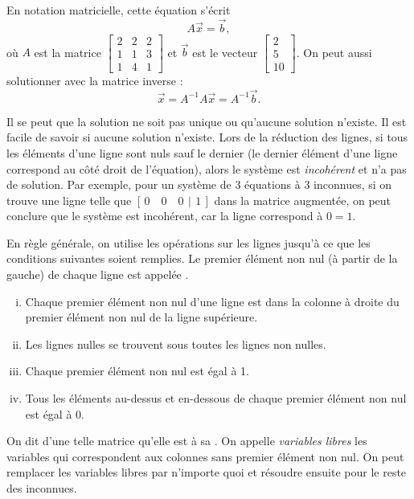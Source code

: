 En notation matricielle, cette équation s’écrit
\begin{equation*}
A \vec{x} = \vec{b} ,
\end{equation*}
où $A$ est la matrice
$\left[ \begin{smallmatrix}
2 & 2 & 2 \\
1 & 1 & 3 \\
1 & 4 & 1 
\end{smallmatrix} \right]$ et $\vec{b}$ est le vecteur
$\left[ \begin{smallmatrix}
2 \\
5 \\
10
\end{smallmatrix} \right]$.  On peut aussi solutionner avec la matrice inverse :
\begin{equation*}
\vec{x} = A^{-1} A \vec{x} = A^{-1} \vec{b} .
\end{equation*}

\medskip

Il se peut que la solution ne soit pas unique ou qu'aucune solution n’existe. Il est facile de savoir si aucune solution n'existe. Lors de la réduction des lignes, si tous les éléments d'une ligne sont nuls sauf le dernier (le dernier élément d’une ligne correspond au côté droit de l'équation), alors le système est \emph{incohérent} et n'a pas de solution. Par exemple, pour un système de 3 équations à 3 inconnues, si on trouve une ligne telle que $[\,0 \quad 0 \quad 0 ~\,|\,~ 1\,]$ dans la matrice augmentée, on peut conclure que le système est incohérent, car la ligne correspond à $0=1$.

\medskip

En règle générale, on utilise les opérations sur les lignes jusqu’à ce que les conditions suivantes soient remplies. Le premier élément non nul (à partir de la gauche) de chaque ligne est appelée
\emph{}.
\begin{enumerate}[(i)]
\item Chaque premier élément non nul d’une ligne est dans la colonne à droite du premier élément non nul de la ligne supérieure.
\item Les lignes nulles se trouvent sous toutes les lignes non nulles.
\item Chaque premier élément non nul est égal à 1.
\item Tous les éléments au-dessus et en-dessous de chaque premier élément non nul est égal à 0.
\end{enumerate}
On dit d'une telle matrice qu'elle est à sa
\emph{}. On appelle \emph{variables libres} les variables qui correspondent aux colonnes sans premier élément non nul. On peut remplacer les variables libres par n’importe quoi et résoudre ensuite pour le reste des inconnues.

